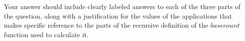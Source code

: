 \documentclass[12pt, oneside]{article}
\begin{document}
\begin{enumerate}[labelindent=0pt, leftmargin=0pt]
\begin{enumerate}
Your answer should include clearly labeled answers to each of the three parts of the question, 
along with a justification for the values of the applications that makes specific reference to 
the parts of the recursive definition of the $basecount$ function used to calculate it.
\end{enumerate}
\end{enumerate}
\end{document}

